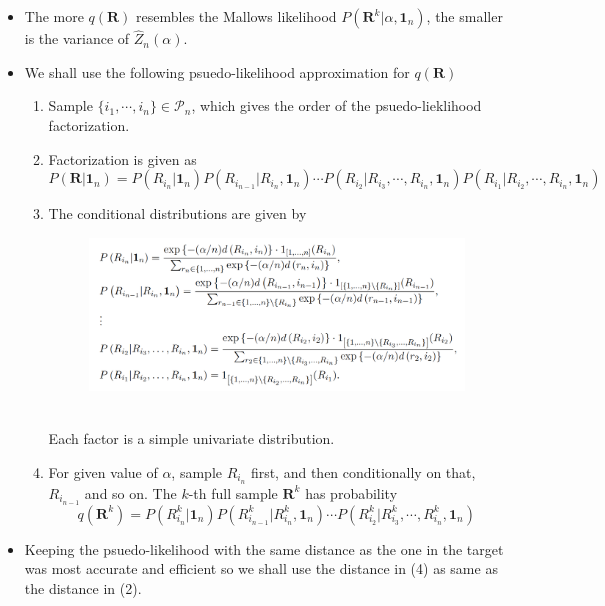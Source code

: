\documentclass[12pt]{article}
\begin{document}
\begin{itemize}
\begin{itemize}
        \item The more $q(\mathbf{R})$ resembles the Mallows likelihood $P(\mathbf{R}^k | \alpha, \mathbf{1}_n)$, the smaller is the variance of $\hat{Z}_n(\alpha)$. 
        \item We shall use the following psuedo-likelihood approximation for $q(\mathbf{R})$
        \begin{enumerate}
            \item Sample $\{i_1, \cdots, i_n\}\in \mathcal{P}_n$, which gives the order of the psuedo-lieklihood factorization.
            \item Factorization is given as \begin{equation*}
                P(\mathbf{R}|\mathbf{1}_n)=P(R_{i_n}|\mathbf{1}_n)P(R_{i_{n-1}}|R_{i_n}, \mathbf{1}_n)\cdots P(R_{i_2}|R_{i_3}, \cdots, R_{i_n}, \mathbf{1}_n)P(R_{i_1}|R_{i_2}, \cdots, R_{i_n}, \mathbf{1}_n)
            \end{equation*}
            
            \item The conditional distributions are given by
            \begin{figure}[h]
                \includegraphics[width=15cm]{ConDist}
                \centering
            \end{figure}
            \\ Each factor is a simple univariate distribution. 
            \item For given value of $\alpha$, sample $R_{i_n}$ first, and then conditionally on that, $R_{i_{n-1}}$ and so on. The $k$-th full sample $\mathbf{R}^k$ has probability \begin{equation*}
                q(\mathbf{R}^k)=P(R_{i_n}^k|\mathbf{1}_n)P(R_{i_{n-1}}^k|R_{i_n}^k, \mathbf{1}_n)\cdots P(R_{i_2}^k|R_{i_3}^k, \cdots, R_{i_n}^k, \mathbf{1}_n)
            \end{equation*}       
        \end{enumerate}
        \item Keeping the psuedo-likelihood with the same distance as the one in the target was most accurate and efficient so we shall use the distance in (4) as same as the distance in (2).
    \end{itemize}
\end{itemize}
\end{document}
